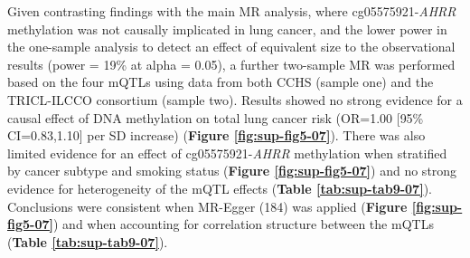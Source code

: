 \documentclass[11pt,oneside]{bristolthesis}
\begin{document}
\begin{table}[!h]

\caption{\label{tab:sup-tab8-07}One-sample MR analysis of the effect of \textit{AHRR} methylation (\%) on lung cancer risk in the CCHS}
\centering
{}
\end{table}
\linebreak

Given contrasting findings with the main MR analysis, where cg05575921-\emph{AHRR} methylation was not causally implicated in lung cancer, and the lower power in the one-sample analysis to detect an effect of equivalent size to the observational results (power = 19\% at alpha = 0.05), a further two-sample MR was performed based on the four mQTLs using data from both CCHS (sample one) and the TRICL-ILCCO consortium (sample two). Results showed no strong evidence for a causal effect of DNA methylation on total lung cancer risk (OR=1.00 {[}95\% CI=0.83,1.10{]} per SD increase) (\textbf{Figure \ref{fig:sup-fig5-07}}). There was also limited evidence for an effect of cg05575921-\emph{AHRR} methylation when stratified by cancer subtype and smoking status (\textbf{Figure \ref{fig:sup-fig5-07}}) and no strong evidence for heterogeneity of the mQTL effects (\textbf{Table \ref{tab:sup-tab9-07}}). Conclusions were consistent when MR-Egger (184) was applied (\textbf{Figure \ref{fig:sup-fig5-07}}) and when accounting for correlation structure between the mQTLs (\textbf{Table \ref{tab:sup-tab9-07}}).
\end{document}
